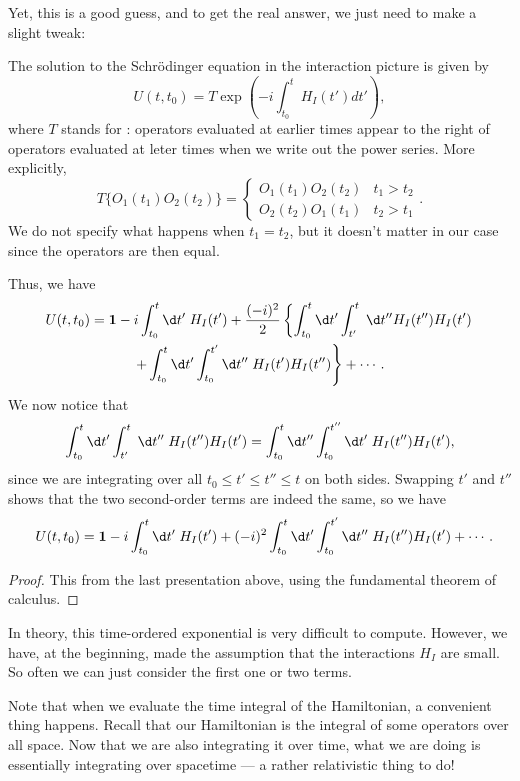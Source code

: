 \documentclass[a4paper]{article}
\begin{document}
Yet, this is a good guess, and to get the real answer, we just need to make a slight tweak:
\begin{prop}
  The solution to the Schr\"odinger equation in the interaction picture is given by
  \[
    U(t, t_0) = T\exp\left(-i \int_{t_0}^t H_I(t') dt'\right),
  \]
  where $T$ stands for : operators evaluated at earlier times appear to the right of operators evaluated at leter times when we write out the power series. More explicitly,
  \[
    T\{O_1(t_1) O_2(t_2)\} =
    \begin{cases}
      O_1(t_1) O_2(t_2) & t_1 > t_2\\
      O_2(t_2) O_1(t_1) & t_2 > t_1
    \end{cases}.
  \]
  We do not specify what happens when $t_1 = t_2$, but it doesn't matter in our case since the operators are then equal.

  Thus, we have
  \begin{multline*}
    U(t, t_0) = \mathbf{1} - i \int_{t_0}^t \d t'\; H_I (t') + \frac{(-i)^2}{2} \left\{\int_{t_0}^t \d t' \int_{t'}^t\;\d t'' H_I(t'') H_I(t')\right.\\
    \left.+ \int_{t_0}^t \d t' \int_{t_0}^{t'} \d t''\; H_I(t') H_I(t'')\right\} + \cdots.
  \end{multline*}
  We now notice that
  \[
    \int_{t_0}^t \d t' \int_{t'}^t \;\d t''\; H_I(t'') H_I(t') = \int_{t_0}^t \d t'' \int_{t_0}^{t''}\d t'\; H_I(t'') H_I(t'),
  \]
  since we are integrating over all $t_0 \leq t' \leq t'' \leq t$ on both sides. Swapping $t'$ and $t''$ shows that the two second-order terms are indeed the same, so we have
  \[
    U(t, t_0) = \mathbf{1} - i \int_{t_0}^t \d t' \; H_I (t') + (-i)^2 \int_{t_0}^t \d t' \int_{t_0}^{t'} \d t'' \; H_I(t'') H_I(t') + \cdots.
  \]
\end{prop}

\begin{proof}
  This from the last presentation above, using the fundamental theorem of calculus.
\end{proof}

In theory, this time-ordered exponential is very difficult to compute. However, we have, at the beginning, made the assumption that the interactions $H_I$ are small. So often we can just consider the first one or two terms.

Note that when we evaluate the time integral of the Hamiltonian, a convenient thing happens. Recall that our Hamiltonian is the integral of some operators over all space. Now that we are also integrating it over time, what we are doing is essentially integrating over spacetime --- a rather relativistic thing to do!
\end{document}
